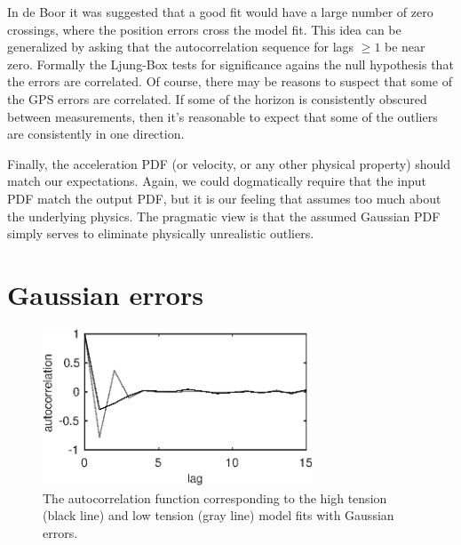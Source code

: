 \documentclass[twocol]{ametsoc}
\begin{document}
In de Boor it was suggested that a good fit would have a large number of zero crossings, where the position errors cross the model fit. This idea can be generalized by asking that the autocorrelation sequence for lags $\geq 1$ be near zero. Formally the Ljung-Box tests for significance agains the null hypothesis that the errors are correlated. Of course, there may be reasons to suspect that some of the GPS errors are correlated. If some of the horizon is consistently obscured between measurements, then it's reasonable to expect that some of the outliers are consistently in one direction.

Finally, the acceleration PDF (or velocity, or any other physical property) should match our expectations. Again, we could dogmatically require that the input PDF match the output PDF, but it is our feeling that assumes too much about the underlying physics. The pragmatic view is that the assumed Gaussian PDF simply serves to eliminate physically unrealistic outliers.

\section{Gaussian errors}

\begin{figure}
  \centerline{\includegraphics[width=19pc,angle=0]{gaussianacf}}
  \caption{The autocorrelation function corresponding to the high tension (black line) and low tension (gray line) model fits with Gaussian errors.}
  \label{gaussianacf}
\end{figure}
\end{document}
